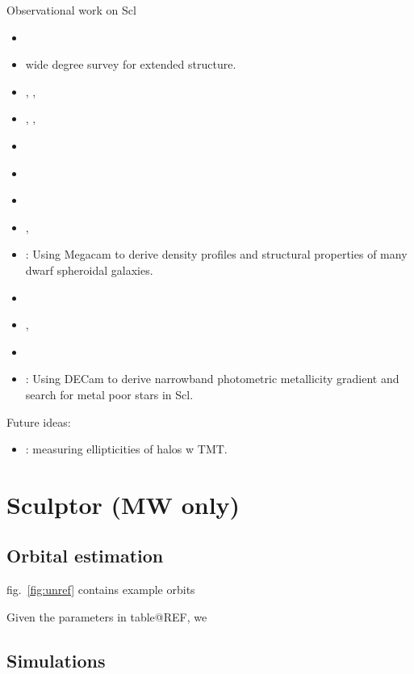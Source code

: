 Observational work on Scl

\begin{itemize}
\tightlist
\item
  \citet{sestito+2023a}
\item
  \citet{westfall+2006} wide degree survey for extended structure.
\item
  \citet{tolstoy+2023}, \citet{arroyo-polonio+2023},
  \citet{arroyo-polonio+2024}
\item
  \citet{eskridge1988}, \citet{eskridge1988a}, \citet{eskridge1988b}
\item
  \citet{coleman+dacosta+bland-hawthorn2005}
\item
  \citet{DQ1994}
\item
  \citet{WMO2009}
\item
  \citet{IH1995},
\item
  \citet{munoz+2018}: Using Megacam to derive density profiles and
  structural properties of many dwarf spheroidal galaxies.
\item
  \citet{kirby+2009}
\item
  \citet{martinez-vazquez+2015}, \citet{pietrzynski+2008}
\item
  \citet{grebel1996}
\item
  \citet{barbosa+2025}: Using DECam to derive narrowband photometric
  metallicity gradient and search for metal poor stars in Scl.
\end{itemize}

Future ideas:

\begin{itemize}
\tightlist
\item
  \citet{evslin2016}: measuring ellipticities of halos w TMT.
\end{itemize}

\section{Sculptor (MW only)}\label{sculptor-mw-only}

\subsection{Orbital estimation}\label{orbital-estimation}

fig.~\ref{fig:unref} contains example orbits

Given the parameters in table@REF, we

\subsection{Simulations}\label{simulations}

